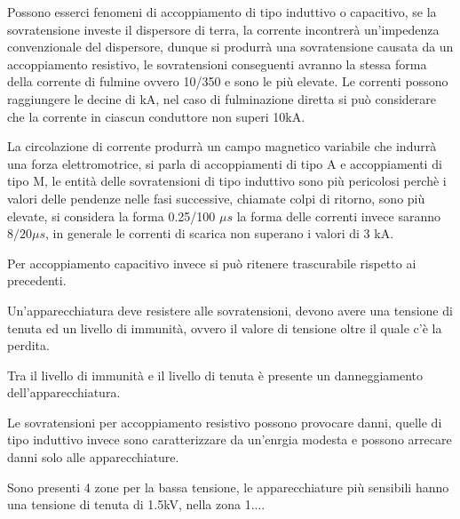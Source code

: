 Possono esserci fenomeni di accoppiamento di tipo induttivo o capacitivo, se la 
sovratensione investe il dispersore di terra, la corrente incontrerà 
un'impedenza convenzionale del dispersore, dunque si produrrà una sovratensione 
causata da un accoppiamento resistivo, le sovratensioni conseguenti avranno la 
stessa forma della corrente di fulmine ovvero 10/350 e sono le più elevate. Le correnti possono raggiungere le decine di kA, nel caso di fulminazione diretta si può considerare che la corrente in ciascun conduttore non superi 10kA.

La circolazione di corrente produrrà un campo magnetico variabile che indurrà una forza elettromotrice, si parla di accoppiamenti di tipo A e accoppiamenti di tipo M, le entità delle sovratensioni di tipo induttivo sono più pericolosi perchè i valori delle pendenze nelle fasi successive, chiamate colpi di ritorno, sono più elevate, si considera la forma 0.25/100 $\mu s$ la forma delle correnti invece saranno $8/20\mu s$, in generale le correnti di scarica non superano i valori di 3 kA.


Per accoppiamento capacitivo invece si può ritenere trascurabile rispetto ai precedenti.

Un'apparecchiatura deve resistere alle sovratensioni, devono avere una tensione di tenuta ed un livello di immunità, ovvero il valore di tensione oltre il quale c'è la perdita.

Tra il livello di immunità e il livello di tenuta è presente un danneggiamento dell'apparecchiatura.

Le sovratensioni per accoppiamento resistivo possono provocare danni, quelle di tipo induttivo invece sono caratterizzare da un'enrgia modesta e possono arrecare danni solo alle apparecchiature.


Sono presenti 4 zone per la bassa tensione, le apparecchiature più sensibili hanno una tensione di tenuta di 1.5kV, nella zona 1....

